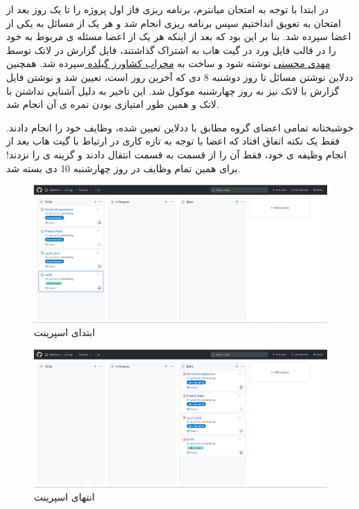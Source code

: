 \documentclass[12pt,a4paper]{article}
\begin{document}
در ابتدا با توجه به امتحان میانترم، برنامه ریزی فاز اول پروژه را تا یک روز بعد از امتحان به تعویق انداختیم سپس برنامه ریزی انجام شد و هر یک از مسائل به یکی از اعضا سپرده شد. بنا بر این بود که بعد از اینکه هر یک از اعضا مسئله ی مربوط به خود را در قالب فایل ورد در گیت هاب به اشتراک گذاشتند، فایل گزارش در لاتک توسط \underline{مهدی محسنی} نوشته شود و ساخت  به \underline{محراب کشاورز گیلده }سپرده شد. همچنین ددلاین نوشتن مسائل تا روز دوشنبه 8 دی که آخرین روز  است، تعیین شد و نوشتن فایل گزارش با لاتک نیز به روز چهارشنبه موکول شد. این تاخیر به دلیل آشنایی نداشتن با لاتک و همین طور امتیازی بودن نمره ی آن انجام شد.

خوشبختانه تمامی اعضای گروه مطابق با ددلاین تعیین شده، وظایف خود را انجام دادند. فقط یک نکته اتفاق افتاد که اعضا با توجه به تازه کاری در ارتباط با گیت هاب بعد از انجام وظیفه ی خود، فقط آن را از قسمت  به قسمت  انتقال دادند و گزینه ی  را نزدند! برای همین تمام وظایف در روز چهارشنبه 10 دی بسته شد.


	\begin{figure}[h!]
		\begin{center}
			\includegraphics[width=14cm]{images/screenshot_1.png}	
		\end{center}
	\caption{ابتدای اسپرینت}
	\end{figure}

	\begin{figure}[h!]
		\begin{center}
			\includegraphics[width=14cm]{images/screenshot_2.png}
		\end{center}
		\caption{انتهای اسپرینت}
	\end{figure}
\end{document}
